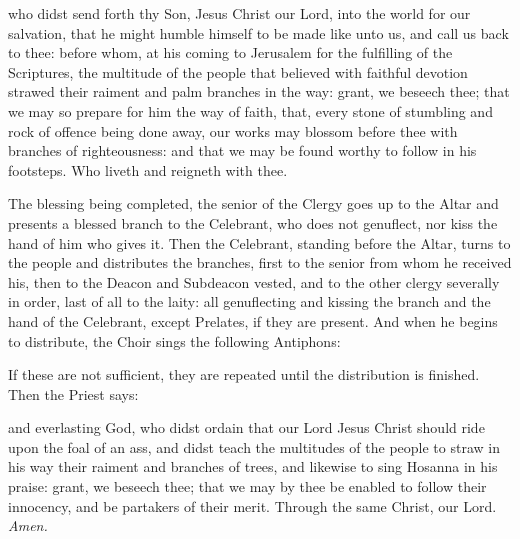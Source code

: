 {} who didst send forth thy Son, Jesus Christ our Lord, into the world for our salvation, that he might humble himself to be made like unto us, and call us back to thee: before whom, at his coming to Jerusalem for the fulfilling of the Scriptures, the multitude of the people that believed with faithful devotion strawed their raiment and palm branches in the way: grant, we beseech thee; that we may so prepare for him the way of faith, that, every stone of stumbling and rock of offence being done away, our works may blossom before thee with branches of righteousness: and that we may be found worthy to follow in his footsteps. Who liveth and reigneth with thee.
\begin{rubric}
    The blessing being completed, the senior of the Clergy goes up to the Altar and presents a blessed branch to the Celebrant, who does not genuflect, nor kiss the hand of him who gives it. Then the Celebrant, standing before the Altar, turns to the people and distributes the branches, first to the senior from whom he received his, then to the Deacon and Subdeacon vested, and to the other clergy severally in order, last of all to the laity: all genuflecting and kissing the branch and the hand of the Celebrant, except Prelates, if they are present. And when he begins to distribute, the Choir sings the following Antiphons:
\end{rubric}\par
{}\par
{}
\begin{rubric}
    If these are not sufficient, they are repeated until the distribution is finished. Then the Priest says:
\end{rubric}
{} and everlasting God, who didst ordain that our Lord Jesus Christ should ride upon the foal of an ass, and didst teach the multitudes of the people to straw in his way their raiment and branches of trees, and likewise to sing Hosanna in his praise: grant, we beseech thee; that we may by thee be enabled to follow their innocency, and be partakers of their merit. Through the same Christ, our Lord. \textit{Amen.}
